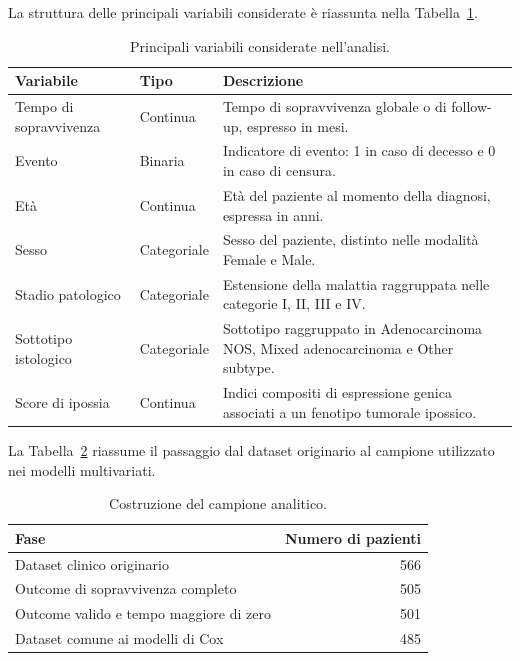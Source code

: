 \documentclass[12pt,a4paper]{article}
\begin{document}
La struttura delle principali variabili considerate è riassunta nella Tabella~\ref{tab:variabili_dataset}.

\begin{table}[H]
\centering
\caption{Principali variabili considerate nell'analisi.}
\label{tab:variabili_dataset}

\renewcommand{\arraystretch}{1.25}
\setlength{\tabcolsep}{8pt}

\begin{tabularx}{\textwidth}{
    >{\raggedright\arraybackslash}p{3.3cm}
    >{\raggedright\arraybackslash}p{2.4cm}
    >{\raggedright\arraybackslash}X
}
\toprule
\textbf{Variabile} & \textbf{Tipo} & \textbf{Descrizione} \\
\midrule

Tempo di sopravvivenza
& Continua
& Tempo di sopravvivenza globale o di follow-up, espresso in mesi. \\

Evento
& Binaria
& Indicatore di evento: 1 in caso di decesso e 0 in caso di censura. \\

Età
& Continua
& Età del paziente al momento della diagnosi, espressa in anni. \\

Sesso
& Categoriale
& Sesso del paziente, distinto nelle modalità Female e Male. \\

Stadio patologico
& Categoriale
& Estensione della malattia raggruppata nelle categorie I, II, III e IV. \\

Sottotipo istologico
& Categoriale
& Sottotipo raggruppato in Adenocarcinoma NOS, Mixed adenocarcinoma e Other subtype. \\

Score di ipossia
& Continua
& Indici compositi di espressione genica associati a un fenotipo tumorale ipossico. \\

\bottomrule
\end{tabularx}
\end{table}

La Tabella~\ref{tab:flusso_pazienti} riassume il passaggio dal dataset originario al campione utilizzato nei modelli multivariati.

\begin{table}[H]
\centering
\caption{Costruzione del campione analitico.}
\label{tab:flusso_pazienti}

\renewcommand{\arraystretch}{1.2}

\begin{tabular}{l r}
\toprule
\textbf{Fase} & \textbf{Numero di pazienti} \\
\midrule
Dataset clinico originario & 566 \\
Outcome di sopravvivenza completo & 505 \\
Outcome valido e tempo maggiore di zero & 501 \\
Dataset comune ai modelli di Cox & 485 \\
\bottomrule
\end{tabular}
\end{table}
\end{document}
